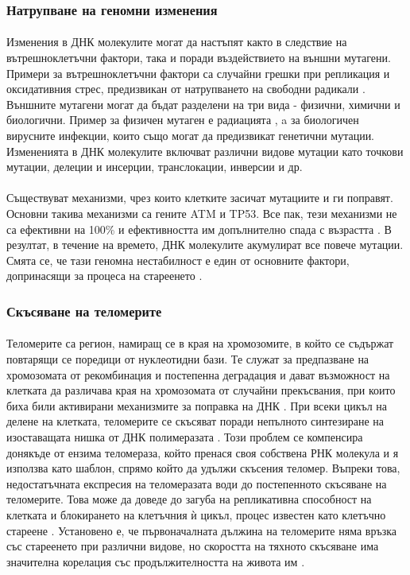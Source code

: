 \documentclass[pdftex,cyrillic,14pt,a4page,twoside,openright]{extreport}
\begin{document}
\subsubsection{Натрупване на геномни изменения}
\paragraph{}
Изменения в ДНК молекулите могат да настъпят както в следствие на вътрешноклетъчни фактори, така и поради въздействието на външни мутагени. Примери за вътрешноклетъчни фактори са случайни грешки при репликация и оксидативния стрес, предизвикан от натрупването на свободни радикали \cite{wang1998}. Външните мутагени могат да бъдат разделени на три вида - физични, химични и биологични. Пример за физичен мутаген е радиацията \cite{breimer1988}, a за биологичен вирусните инфекции, които също могат да предизвикат генетични мутации. Измененията в ДНК молекулите включват различни видове мутации като точкови мутации, делеции и инсерции, транслокации, инверсии и др.\\\\
Съществуват механизми, чрез които клетките засичат мутациите и ги поправят. Основни такива механизми са гените ATM и TP53. Все пак, тези механизми не са ефективни на 100\% и ефективността им допълнително спада с възрастта \cite{auley2017}. В резултат, в течение на времето, ДНК молекулите акумулират все повече мутации. Смята се, че тази геномна нестабилност е един от основните фактори, допринасящи за процеса на стареенето \cite{vijg2013}.

\subsubsection{Скъсяване на теломерите}
\paragraph{}
Теломерите са регион, намиращ се в края на хромозомите, в който се съдържат повтарящи се поредици от нуклеотидни бази. Те служат за предпазване на хромозомата от рекомбинация и постепенна деградация и дават възможност на клетката да различава края на хромозомата от случайни прекъсвания, при които биха били активирани механизмите за поправка на ДНК \cite{griffith1999}. При всеки цикъл на делене на клетката, теломерите се скъсяват поради непълното синтезиране на изоставащата нишка от ДНК полимеразата \cite{koliada2015}. Този проблем се компенсира донякъде от ензима теломераза, който пренася своя собствена РНК молекула и я използва като шаблон, спрямо който да удължи скъсения теломер. Въпреки това, недостатъчната експресия на теломеразата води до постепенното скъсяване на теломерите. Това може да доведе до загуба на репликативна способност на клетката и блокирането на клетъчния ѝ цикъл, процес известен като клетъчно стареене \cite{muraki2012}. Установено е, че първоначалната дължина на теломерите няма връзка със стареенето при различни видове, но скоростта на тяхното скъсяване има значителна корелация със продължителността на живота им \cite{whittemore2019}.
\end{document}
